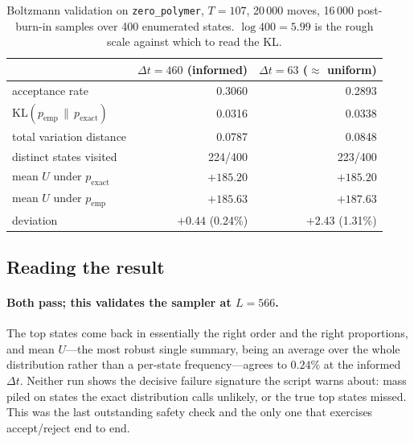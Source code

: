 \documentclass[11pt,a4paper]{article}
\newcommand{\dt}{\Delta t}
\begin{document}
\begin{table}[htbp]
\centering
\begin{tabular}{l rr}
\toprule
 & $\dt=460$ (informed) & $\dt=63$ ($\approx$ uniform) \\
\midrule
acceptance rate                  & 0.3060   & 0.2893 \\
$\mathrm{KL}(p_{\mathrm{emp}} \,\|\, p_{\mathrm{exact}})$
                                 & 0.0316   & 0.0338 \\
total variation distance         & 0.0787   & 0.0848 \\
distinct states visited          & 224/400  & 223/400 \\
\midrule
mean $U$ under $p_{\mathrm{exact}}$   & $+185.20$ & $+185.20$ \\
mean $U$ under $p_{\mathrm{emp}}$     & $+185.63$ & $+187.63$ \\
deviation                             & $+0.44$ \;(0.24\%) & $+2.43$ \;(1.31\%) \\
\bottomrule
\end{tabular}
\caption{Boltzmann validation on \texttt{zero\_polymer}, $T=107$,
20\,000 moves, 16\,000 post-burn-in samples over 400 enumerated states.
$\log 400 = 5.99$ is the rough scale against which to read the KL.}
\label{tab:460v63}
\end{table}

\subsection{Reading the result}

\paragraph{Both pass; this validates the sampler at $L=566$.} The top states
come back in essentially the right order and the right proportions, and mean
$U$---the most robust single summary, being an average over the whole
distribution rather than a per-state frequency---agrees to $0.24\%$ at the
informed $\dt$. Neither run shows the decisive failure signature the script
warns about: mass piled on states the exact distribution calls unlikely, or
the true top states missed. This was the last outstanding safety check and the
only one that exercises accept/reject end to end.
\end{document}
